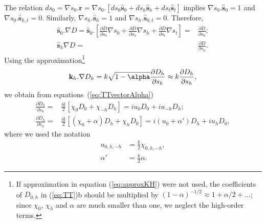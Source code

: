 \documentclass{iucr}
\begin{document}
The relation $d s_0 = \nabla s_0 . \textbf{r}= \nabla s_0 . [ d s_0 \hat{\textbf{s}}_0 + d s_h \hat{\textbf{s}}_h + d s_t \hat{\textbf{s}}_t ]$ implies $\nabla s_0 . \hat{\textbf{s}}_0=1$ and $\nabla s_0 . \hat{\textbf{s}}_{h,t}=0$. Similarly, $\nabla s_h . \hat{\textbf{s}}_h=1$ and $\nabla s_h . \hat{\textbf{s}}_{0,t}=0$. Therefore, 
\begin{subequations}
\label{eq:equalities}
\begin{align}
\hat{\textbf{s}}_0 . \nabla D=
\hat{\textbf{s}}_0 . \left[ 
\frac{\partial D}{\partial s_0} \nabla s_0 + 
\frac{\partial D}{\partial s_h} \nabla s_h +
\frac{\partial D}{\partial s_t} \nabla s_t
\right] 
=& \frac{\partial D}{\partial s_0}
; \\
\hat{\textbf{s}}_h \nabla D =& 
\frac{\partial D}{\partial s_h}.
\end{align}
\end{subequations}
Using the approximation\footnote{
If approximation in equation (\ref{eq:approxKH}) were not used, the coefficients of $D_{0,h}$ in (\ref{eq:TT})b should be multiplied by $(1-\alpha)^{-1/2} \approx 1 + \alpha/2 + ...$; since $\chi_0$, $\chi_h$ and $\alpha$ are much smaller than one, we neglect the high-order terms.
}
\begin{equation}\label{eq:approxKH}
\textbf k_h . \nabla D_h = 
k \sqrt{1-\alpha} \frac{\partial D_h}{\partial s_h}
\approx k \frac{\partial D_h}{ \partial s_h},
\end{equation}
we obtain from equations~(\ref{eq:TTvectorAlpha})
\begin{subequations}\label{eq:TT}
\begin{align}
\frac{\partial D_0}{\partial s_0} =& \frac{ik}{2} \left[ \chi_0 D_0+ \chi_{-h} D_h \right] = i u_0 D_0 + i u_{-h} D_h; \\
\frac{\partial D_h}{\partial s_h} =& \frac{ik}{2} \left[ (\chi_0 + \alpha) D_h+ \chi_{h} D_0 \right] = i (u_0 + \alpha') D_h + i u_h D_0,
\end{align}
\end{subequations}
where we used the notation 
\begin{subequations}
\label{eq:uandalphaprime}
\begin{align}
    u_{0,h,-h}&=\frac{k}{2} \chi_{0,h,-h},  \\
     \alpha'  &= \frac{k}{2}  \alpha.
\end{align}
\end{subequations}
\end{document}

